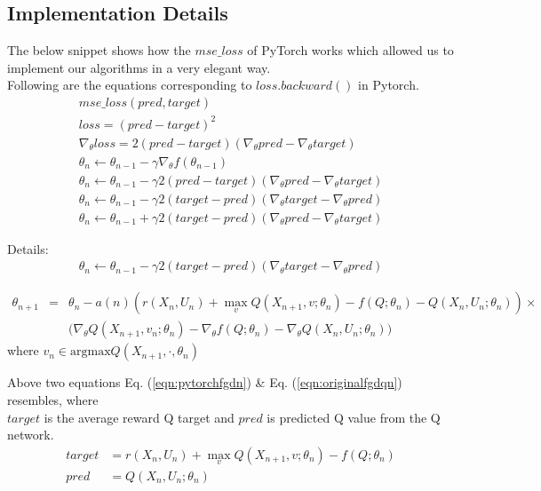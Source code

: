 \documentclass{article}
\theoremstyle{definition}
\begin{document}
\clearpage
\subsection{Implementation Details}
The below snippet shows how the $mse\_loss$ of PyTorch \cite{pytorch} works which allowed us to implement our algorithms in a very elegant way.\\
Following are the equations corresponding to $loss.backward()$ in Pytorch.
\begin{align*}
    mse\_loss(pred,target)\\
    loss = (pred-target)^2\\
    \nabla_{\theta} loss = 2(pred-target)(\nabla_{\theta}pred-\nabla_{\theta}target) \\
    \theta_{n} \leftarrow \theta_{n-1} - \gamma \nabla_{\theta} f(\theta_{n-1})\\
    \theta_{n} \leftarrow \theta_{n-1} - \gamma 2(pred-target)(\nabla_{\theta}pred-\nabla_{\theta}target)\\
    \theta_{n} \leftarrow \theta_{n-1} - \gamma 2(target-pred)(\nabla_{\theta}target-\nabla_{\theta}pred)\\
    \theta_{n} \leftarrow \theta_{n-1} + \gamma 2(target-pred)(\nabla_{\theta}pred-\nabla_{\theta}target)
\end{align*}

Details:
\begin{eqnarray}
\label{eqn:pytorchfgdn}
\theta_{n} \leftarrow \theta_{n-1} - \gamma 2(target-pred)(\nabla_{\theta}target-\nabla_{\theta}pred)
\end{eqnarray}

\begin{eqnarray}
\label{eqn:originalfgdqn}
\theta_{n+1} &=& \theta_n - a(n)\left(r(X_n,U_n) +\max_v Q(X_{n+1}, v; \theta_n) -f(Q;\theta_n) - Q(X_n, U_n;\theta_n)\right)\times \nonumber \\
&& \Big(\nabla_\theta Q(X_{n+1}, v_n; \theta_n) - \nabla_\theta f(Q;\theta_n) - \nabla_\theta Q(X_n, U_n; \theta_n)\Big) 
\end{eqnarray}
where $v_n \in \text{argmax} Q(X_{n+1},\cdot,\theta_n)$

Above  two equations Eq. (\ref{eqn:pytorchfgdn}) \& Eq. (\ref{eqn:originalfgdqn}) resembles, where\\
$target$ is the average reward Q target and $pred$ is predicted Q value from the Q network.
\begin{align*}
    target &= r(X_n,U_n) +\max_v Q(X_{n+1}, v; \theta_n) -f(Q;\theta_n) \\
    pred &= Q(X_n, U_n;\theta_n)
\end{align*}
    
\end{document}
